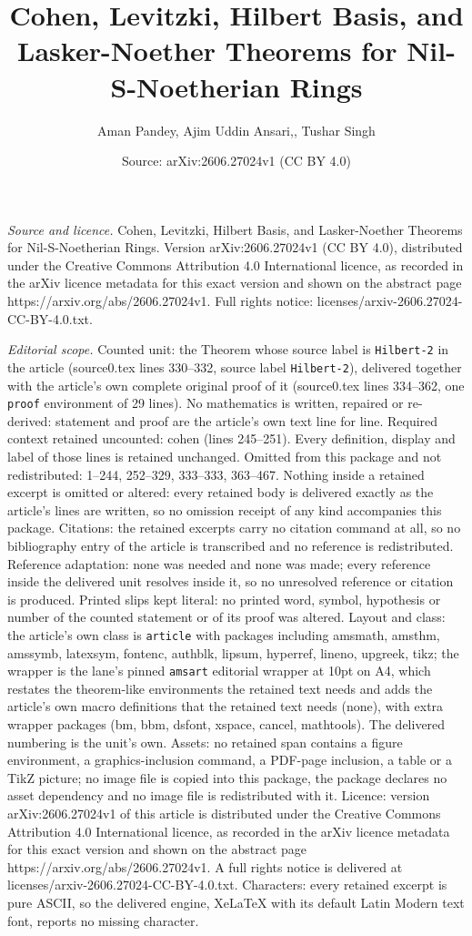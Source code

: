 \documentclass[10pt,a4paper]{amsart}
\title[Cohen, Levitzki, Hilbert Basis, and Lasker-Noether Theorems ]{Cohen, Levitzki, Hilbert Basis, and Lasker-Noether Theorems for Nil-S-Noetherian Rings}
\author{Aman Pandey, Ajim Uddin Ansari,, Tushar Singh}
\date{Source: arXiv:2606.27024v1 (CC BY 4.0)}
\begin{document}
\maketitle

\noindent\emph{Source and licence.} Cohen, Levitzki, Hilbert Basis, and Lasker-Noether Theorems for Nil-S-Noetherian Rings. Version arXiv:2606.27024v1 (CC BY 4.0), distributed under the Creative Commons Attribution 4.0 International licence, as recorded in the arXiv licence metadata for this exact version and shown on the abstract page https://arxiv.org/abs/2606.27024v1. Full rights notice: licenses/arxiv-2606.27024-CC-BY-4.0.txt.\par\smallskip

\noindent\textit{Editorial scope.} Counted unit: the Theorem whose source label is \texttt{Hilbert-2} in the article (source0.tex lines 330--332, source label \texttt{Hilbert-2}), delivered together with the article's own complete original proof of it (source0.tex lines 334--362, one \texttt{proof} environment of 29 lines). No mathematics is written, repaired or re-derived: statement and proof are the article's own text line for line. Required context retained uncounted: cohen (lines 245--251). Every definition, display and label of those lines is retained unchanged. Omitted from this package and not redistributed: 1--244, 252--329, 333--333, 363--467. Nothing inside a retained excerpt is omitted or altered: every retained body is delivered exactly as the article's lines are written, so no omission receipt of any kind accompanies this package. Citations: the retained excerpts carry no citation command at all, so no bibliography entry of the article is transcribed and no reference is redistributed. Reference adaptation: none was needed and none was made; every reference inside the delivered unit resolves inside it, so no unresolved reference or citation is produced. Printed slips kept literal: no printed word, symbol, hypothesis or number of the counted statement or of its proof was altered. Layout and class: the article's own class is \texttt{article} with packages including amsmath, amsthm, amssymb, latexsym, fontenc, authblk, lipsum, hyperref, lineno, upgreek, tikz; the wrapper is the lane's pinned \texttt{amsart} editorial wrapper at 10pt on A4, which restates the theorem-like environments the retained text needs and adds the article's own macro definitions that the retained text needs (none), with extra wrapper packages (bm, bbm, dsfont, xspace, cancel, mathtools). The delivered numbering is the unit's own. Assets: no retained span contains a figure environment, a graphics-inclusion command, a PDF-page inclusion, a table or a TikZ picture; no image file is copied into this package, the package declares no asset dependency and no image file is redistributed with it. Licence: version arXiv:2606.27024v1 of this article is distributed under the Creative Commons Attribution 4.0 International licence, as recorded in the arXiv licence metadata for this exact version and shown on the abstract page https://arxiv.org/abs/2606.27024v1. A full rights notice is delivered at licenses/arxiv-2606.27024-CC-BY-4.0.txt. Characters: every retained excerpt is pure ASCII, so the delivered engine, XeLaTeX with its default Latin Modern text font, reports no missing character.
\end{document}
